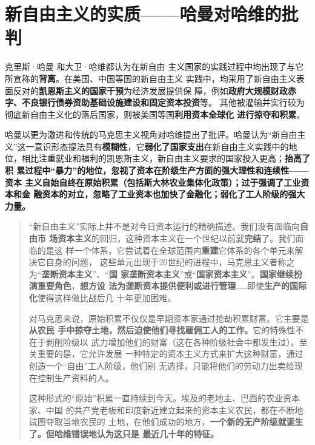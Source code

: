 \section[新自由主义的实质]{新自由主义的实质——哈曼对哈维的批判}

克里斯·哈曼\cite{chrisharmanneo1} \cite{chrisharmanneo2}和大卫·哈维都认为在新自由
主义国家的实践过程中均出现了与它所宣称的\textbf{背离}。在美国、中国等国的新自由主义
实践中，均采用了新自由主义表面反对的\textbf{凯恩斯主义的国家干预}为经济发展提供保
障，例如\textbf{政府大规模财政赤字、不良银行债券资助基础设施建设和固定资本投资}等。
其他被灌输并实行较为彻底新自由主义化的落后国家，则被美国等国\textbf{利用资本全球化
  进行掠夺和积累}。

哈曼以更为激进和传统的马克思主义视角对哈维提出了批评。哈曼认为“新自由主
义”这一意识形态提法具有\textbf{模糊性}，它\textbf{弱化了国家支出}在新自由主义实践中的地
位，相比注重就业和福利的凯恩斯主义，新自由主义要求的国家投入更高；\textbf{抬高了积
  累过程中“暴力”的地位，忽视了资本在阶级生产方面的强大理性和连续性——资本
  主义自始自终在原始积累（包括斯大林农业集体化政策）；过于强调了工业资本和金
  融资本的对立，忽略了工业资本也加快了金融化；弱化了工人阶级的强大力量。}
\begin{quotation}
  “新自由主义”实际上并不是对今日资本运行的精确描述。我们没有面临向\textbf{自由市
    场资本主义}的回归，这种资本主义在一个世纪以前就\textbf{完结}了。我们面临的是这
  样一个体系，它尝试着在全球范围内\textbf{重建}它体系的各个单元来解决它自身的问题，
  这些单元出现于20世纪的进程中，马克思主义者称之为“\textbf{垄断资本主义}”、“\textbf{国
    家垄断资本主义}”或“\textbf{国家资本主义}”。\textbf{国家继续扮演重要角色}，\textbf{想方设
    法为垄断资本提供便利或进行管理}……即使\textbf{生产的国际化}使得这样做比战后几
  十年更加困难。

  对马克思来说，原始积累不仅仅是早期资本家通过抢劫积累财富。它主要是\textbf{从农民
    手中掠夺土地，然后迫使他们寻找雇佣工人的工作。}它的特殊性不在于剥削阶级以
  武力增加他们的财富（这在各种阶级社会中都发生过）。至关重要的是，它允许发展
  一种特定的资本主义方式来扩大这种财富，通过创造一个“自由”工人阶级，他们别
  无选择，只能将他们的劳动力出卖给现在控制生产资料的人。

  这种形式的“原始”积累一直持续到今天。埃及的老地主、巴西的农业资本家、中国
  的共产党老板和印度新近建立起来的资本主义农民，都在不断地试图夺取当地农民的
  土地，在他们成功的地方，\textbf{一个新的无产阶级就诞生了。但哈维错误地认为这只是
    最近几十年的特征。}
\end{quotation}



